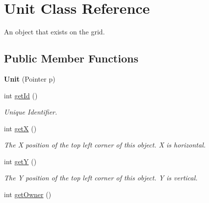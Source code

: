 \hypertarget{classUnit}{
\section{Unit Class Reference}
\label{classUnit}
}


An object that exists on the grid.  


\subsection*{Public Member Functions}
\begin{DoxyCompactItemize}
\item 
\hypertarget{classUnit_a2855ec698ccacac7d041b815492c7058}{
{\bfseries Unit} (Pointer p)}
\label{classUnit_a2855ec698ccacac7d041b815492c7058}

\item 
\hypertarget{classUnit_a1c0dd788c1e32351a385dd2d75cb36b4}{
int \hyperlink{classUnit_a1c0dd788c1e32351a385dd2d75cb36b4}{getId} ()}
\label{classUnit_a1c0dd788c1e32351a385dd2d75cb36b4}

\begin{DoxyCompactList}\small\item\em Unique Identifier. \item\end{DoxyCompactList}\item 
\hypertarget{classUnit_a1e612a48ea929b7628195e26a86ce037}{
int \hyperlink{classUnit_a1e612a48ea929b7628195e26a86ce037}{getX} ()}
\label{classUnit_a1e612a48ea929b7628195e26a86ce037}

\begin{DoxyCompactList}\small\item\em The X position of the top left corner of this object. X is horizontal. \item\end{DoxyCompactList}\item 
\hypertarget{classUnit_ab103f4e688f764e5f1a45ab37b30f6cc}{
int \hyperlink{classUnit_ab103f4e688f764e5f1a45ab37b30f6cc}{getY} ()}
\label{classUnit_ab103f4e688f764e5f1a45ab37b30f6cc}

\begin{DoxyCompactList}\small\item\em The Y position of the top left corner of this object. Y is vertical. \item\end{DoxyCompactList}\item 
\hypertarget{classUnit_a4b94a3699b76b32dd963eb7b0f4a762c}{
int \hyperlink{classUnit_a4b94a3699b76b32dd963eb7b0f4a762c}{getOwner} ()}
\label{classUnit_a4b94a3699b76b32dd963eb7b0f4a762c}


\end{DoxyCompactItemize}
